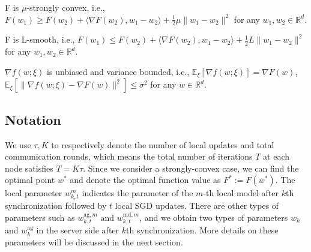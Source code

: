 \begin{assumption} \label{assumption2}
F is $\mu$-strongly convex, i.e., $F(w_1) \geq F(w_2) + \langle \nabla F(w_2), w_1-w_2 \rangle + \frac{1}{2}\mu \|w_1-w_2\|^2$ for any $w_1, w_2 \in \mathbb{R}^d$.
\end{assumption}

\begin{assumption} \label{assumption3}
F is L-smooth, i.e., $F(w_1) \leq F(w_2) + \langle \nabla F(w_2), w_1-w_2 \rangle + \frac{1}{2}L \|w_1-w_2\|^2$ for any $w_1, w_2 \in \mathbb{R}^d$.
\end{assumption}

\begin{assumption} \label{assumption4}
$\nabla f(w; \xi)$ is unbiased and variance bounded, i.e., $\mathbb{E}_\xi[\nabla f(w; \xi)] = \nabla F(w)$, $\mathbb{E}_\xi[\|\nabla f(w; \xi) - \nabla F(w)\|^2] \leq \sigma^2$ for any $w \in \mathbb{R}^d$.
\end{assumption}


\subsection{Notation}

We use $\tau, K$ to respectively denote the number of local updates and total communication rounds, which means the total number of iterations $T$ at each node satisfies $T = K\tau$. Since we consider a strongly-convex case, we can find the optimal point $w^*$ and denote the optimal function value as $F^* := F(w^*)$. The local parameter $w_{k, t}^m$ indicates the parameter of the $m$-th local model after $k$th synchronization followed by $t$ local SGD updates. There are other types of parameters such as $w_{k, t}^{\textrm{ag}, m} \textrm{ and } w_{k, t}^{\textrm{md}, m}$, and we obtain two types of parameters $w_k$ and $w_k^{\textrm{ag}}$ in the server side after $k$th synchronization. More details on these parameters will be discussed in the next section. 